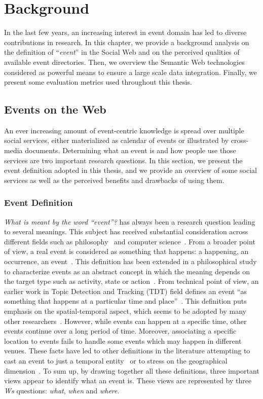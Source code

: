 \chapter{Background}   \label{ch:background}
\graphicspath{{Background/figures/}}

In the last few years, an increasing interest in event domain has led to diverse contributions in research. In this chapter, we provide a background analysis on the definition of ``\emph{event}'' in the Social Web and on the perceived qualities of available event directories. Then, we overview the Semantic Web technologies considered as powerful means to ensure a large scale data integration. Finally, we present some evaluation metrics used throughout this thesis.

\section{Events on the Web}   \label{sec:events-web}
An ever increasing amount of event-centric knowledge is spread over multiple social services, either materialized as calendar of events or illustrated by cross-media documents. Determining what an event is and how people use those services are two important research questions. In this section, we present the event definition adopted in this thesis, and we provide an overview of some social services as well as the perceived benefits and drawbacks of using them.

\subsection{Event Definition} \label{sec:events-def}
\emph{What is meant by the word ``event''?} has always been a research question leading to several meanings. This subject has received substantial consideration across different fields such as philosophy~\cite{Casati:2010} and computer science~\cite{Allan:1998}. From a broader point of view, a real event is considered as something that happens: a happening, an occurrence, an event~\cite{Scholes:1980}. This definition has been extended in a philosophical study to characterize events as an abstract concept in which the meaning depends on the target type such as activity, state or action~\cite{Casati:2010}. From technical point of view, an earlier work in Topic Detection and Tracking (TDT) field defines an event ``as something that happens at a particular time and place''~\cite{Allan:1998}. This definition puts emphasis on the spatial-temporal aspect, which seems to be adopted by many other researchers~\cite{Li:SIGIR05,Zhang:SIGIR07}. However, while events can happen at a specific time, other events continue over a long period of time. Moreover, associating a specific location to events fails to handle some events which may happen in different venues. These facts have led to other definitions in the literature attempting to cast an event to just a temporal entity~\cite{Rattenbury:SIGIR0} or to stress on the geographical dimension~\cite{Smith:SIGIR02}. To sum up, by drawing together all these definitions, three important views appear to identify what an event is. These views are represented by three \emph{Ws} questions: \emph{what}, \emph{when} and \emph{where}.

